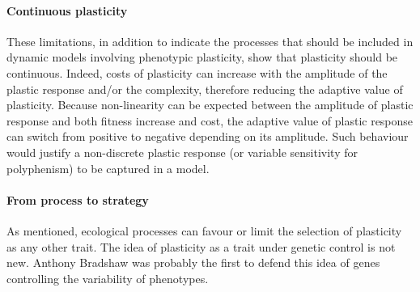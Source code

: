 \paragraph{Continuous plasticity}
These limitations, in addition to indicate the processes that should be included in dynamic models involving phenotypic plasticity, show that plasticity should be continuous. Indeed, costs of plasticity can increase with the amplitude of the plastic response and/or the complexity, therefore reducing the adaptive value of plasticity. Because non-linearity can be expected between the amplitude of plastic response and both fitness increase and cost, the adaptive value of plastic response can switch from positive to negative depending on its amplitude. Such behaviour would justify a non-discrete plastic response (or variable sensitivity for polyphenism) to be captured in a model.
%
%


%
%


\paragraph{From process to strategy}

As mentioned, ecological processes can favour or limit the selection of plasticity as any other trait. The idea of plasticity as a trait under genetic control is not new. Anthony Bradshaw was probably the first to defend this idea of genes controlling the variability of phenotypes. 

